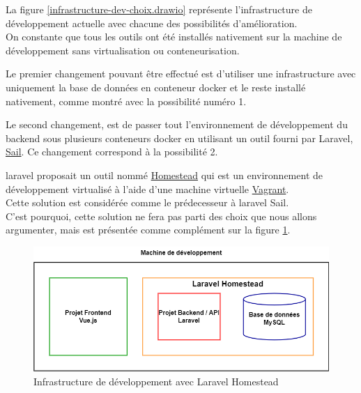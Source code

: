 \documentclass[
    iai, %
    il, %
]{heig-tb}
\begin{document}
La figure \ref{infrastructure-dev-choix.drawio} représente l'infrastructure de développement actuelle avec chacune des possibilités d'amélioration. \\
On constante que tous les outils ont été installés nativement sur la machine de développement sans virtualisation ou conteneurisation.

Le premier changement pouvant être effectué est d'utiliser une infrastructure avec uniquement la base de données en \Gls{conteneur} \Gls{docker} et le reste installé nativement, comme montré avec la possibilité numéro 1.

Le second changement, est de passer tout l'environnement de développement du \Gls{backend} sous plusieurs \Gls{conteneur}s \Gls{docker} en utilisant un outil fourni par Laravel, \href{https://laravel.com/docs/9.x/sail}{Sail}. Ce changement correspond à la possibilité 2.

\Gls{laravel} proposait un outil nommé \href{https://laravel.com/docs/9.x/homestead}{Homestead} qui est un environnement de développement virtualisé à l'aide d'une machine virtuelle \href{https://www.vagrantup.com/}{Vagrant}. \\
Cette solution est considérée comme le prédecesseur à \Gls{laravel} Sail.\\
C'est pourquoi, cette solution ne fera pas parti des choix que nous allons argumenter, mais est
présentée comme complément sur la figure \ref{infrastructure-dev-laravel-homestead.drawio}.


\begin{center}
    \begin{figure}[H]
        \includegraphics[width=\textwidth]{./assets/figures/infrastructure-dev-laravel-homestead.drawio.png}
        \caption{Infrastructure de développement avec Laravel Homestead \label{infrastructure-dev-laravel-homestead.drawio}}
    \end{figure}
\end{center}
\end{document}
